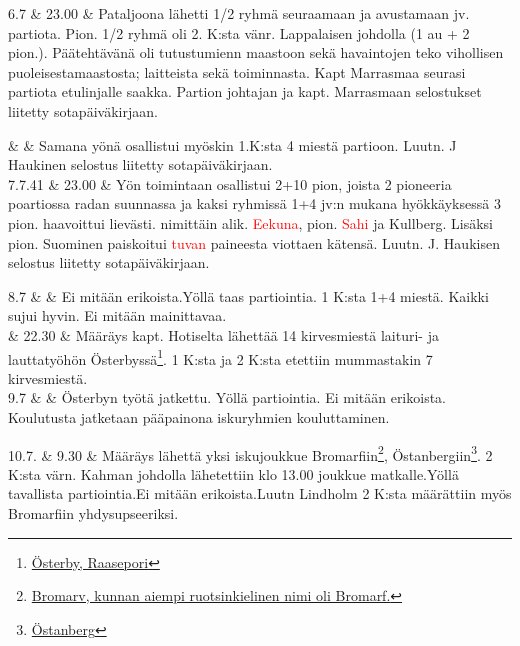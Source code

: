 \documentclass[11pt,a5paper,oneside]{book}
\begin{document}
6.7 & 23.00 & Pataljoona lähetti 1/2 ryhmä seuraamaan ja avustamaan jv. partiota. Pion. 1/2 ryhmä oli 2. K:sta vänr. Lappalaisen johdolla (1 au + 2 pion.). Päätehtävänä oli tutustumienn maastoon sekä havaintojen teko vihollisen puoleisestamaastosta; laitteista sekä toiminnasta. Kapt Marrasmaa seurasi partiota etulinjalle saakka. Partion johtajan ja kapt. Marrasmaan selostukset liitetty sotapäiväkirjaan.\\

\taulustop


& & Samana yönä osallistui myöskin 1.K:sta 4 miestä partioon. Luutn. J Haukinen selostus liitetty sotapäiväkirjaan.\newline\newline\newline\newline\\

7.7.41 & 23.00 & Yön toimintaan osallistui 2+10 pion, joista 2 pioneeria poartiossa radan suunnassa ja kaksi ryhmissä 1+4 jv:n mukana hyökkäyksessä 3 pion. haavoittui lievästi. nimittäin alik. \textcolor{red}{Eekuna}, pion. \textcolor{red}{Sahi} ja Kullberg. Lisäksi pion. Suominen paiskoitui \textcolor{red}{tuvan} paineesta viottaen kätensä. Luutn. J. Haukisen selostus liitetty sotapäiväkirjaan.\\ 
\newpage
 
 8.7 & & Ei mitään erikoista.\newline Yöllä taas partiointia. 1 K:sta 1+4 miestä. Kaikki sujui hyvin. Ei mitään mainittavaa.\newline\\ 

 & 22.30 & Määräys kapt. Hotiselta lähettää 14 kirvesmiestä laituri- ja lauttatyöhön Österbyssä\footnote{\href{https://www.google.fi/maps/place/\%C3\%96sterby,+10620+Raasepori/}{Österby, Raasepori}}. 1 K:sta ja 2 K:sta etettiin mummastakin 7 kirvesmiestä.\newline\\ 

 9.7 & & Österbyn työtä jatkettu. Yöllä partiointia. Ei mitään erikoista. Koulutusta jatketaan pääpainona iskuryhmien kouluttaminen.\\ 

\taulustop


10.7. & 9.30 & Määräys lähettä yksi iskujoukkue Bromarfiin\footnote{\href{https://www.google.fi/maps/place/Bromarv/}{Bromarv, kunnan aiempi ruotsinkielinen nimi oli Bromarf.}}, Östanbergiin\footnote{\href{https://www.google.fi/maps/place/10570+\%C3\%96stanberg/}{Östanberg}}. 2 K:sta värn. Kahman johdolla lähetettiin klo 13.00 joukkue matkalle.\newline Yöllä tavallista partiointia.\newline Ei mitään erikoista.\newline Luutn Lindholm 2 K:sta määrättiin myös Bromarfiin yhdysupseeriksi.\\
\end{document}
